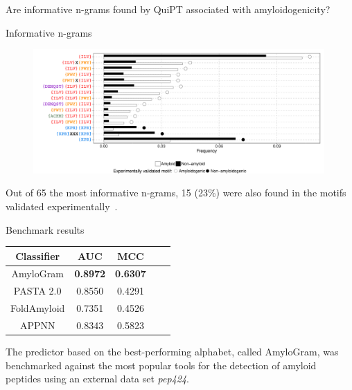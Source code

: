 \documentclass{beamer}\usepackage[]{graphicx}\usepackage[]{color}
\begin{document}
\begin{frame}{}
Are informative n-grams found by QuiPT associated with amyloidogenicity?
\end{frame}


\begin{frame}{Informative n-grams}
\begin{figure} 
\includegraphics[width=0.99\textwidth]{static_figure/ngrams.pdf}
\end{figure}

Out of 65 the most informative n-grams, 15 (23\%) were also found in the motifs validated experimentally~\citep{paz_sequence_2004}.
\end{frame}


\begin{frame}{Benchmark results}

\begin{table}[ht]
\centering

\begin{tabular}{ccccc}
  \toprule
Classifier & AUC & MCC \\ 
  \midrule
AmyloGram & \textbf{0.8972} & \textbf{0.6307} \\ 
  \rowcolor{white}PASTA 2.0 \citep{walsh_pasta_2014} & 0.8550 & 0.4291  \\ 
   FoldAmyloid \citep{garbuzynskiy_foldamyloid:_2010} & 0.7351 & 0.4526  \\ 
  \rowcolor{white}APPNN \citep{familia_prediction_2015} & 0.8343 & 0.5823  \\ 
   \bottomrule
\end{tabular}
\end{table}

The predictor based on the best-performing alphabet, called AmyloGram, was benchmarked against the most popular tools for the detection of amyloid peptides using an external data set \textit{pep424}.

\footnotesize

\end{frame}
\end{document}
